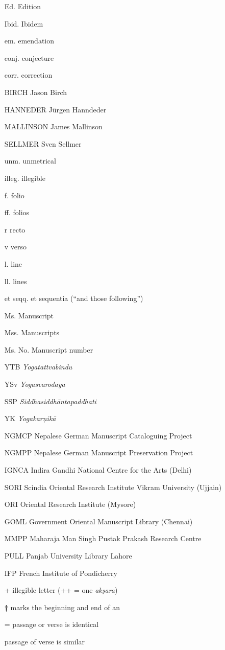 \begin{itemize}
\item[Ed.]  Edition
\item[Ibid.]  Ibidem
\item[em.]  emendation
\item[conj.]  conjecture
\item[corr.]  correction
\item[BIRCH]  Jason Birch
\item[HANNEDER]  Jürgen Hanndeder
\item[MALLINSON]  James Mallinson
\item[SELLMER]  Sven Sellmer  
\item[unm.]  unmetrical
\item[illeg.]  illegible
\item[f.]  folio
\item[ff.]  folios
\item[r]  recto
\item[v]  verso
\item[l.]  line
\item[ll.]  lines
\item[et seqq.] et sequentia (``and those following'')
\item[Ms.]  Manuscript
\item[Mss.]  Manuscripts
\item[Ms. No.]  Manuscript number 
\item[YTB]  \emph{Yogatattvabindu} 
\item[YSv]  \emph{Yogasvarodaya}
\item[SSP]  \emph{Siddhasiddhāntapaddhati}
\item[YK]  \emph{Yogakarṇikā}
\item[NGMCP] Nepalese German Manuscript Cataloguing Project
\item[NGMPP] Nepalese German Manuscript Preservation Project
\item[IGNCA] Indira Gandhi National Centre for the Arts (Delhi)
\item[SORI] Scindia Oriental Research Institute Vikram University (Ujjain)
\item[ORI] Oriental Research Institute (Mysore) 
\item[GOML] Government Oriental Manuscript Library (Chennai)
\item[MMPP]  Maharaja Man Singh Pustak Prakash Research Centre
\item[PULL]  Panjab University Library Lahore
\item[IFP] French Institute of Pondicherry 
\item[+] illegible letter (++ = one \textit{akṣara}) 
\item[\Large{\textbf{†}}] marks the beginning and end of an
\item[=] passage or verse is identical
\item[\approx] passage of verse is similar
\end{itemize}

